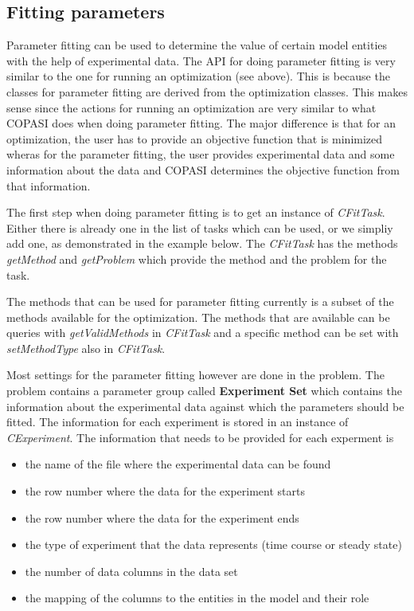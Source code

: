 \documentclass[a4,10pt]{article}
\begin{document}
\subsection{Fitting parameters}
\label{ParameterFitting}

Parameter fitting can be used to determine the value of certain model entities with the help of experimental data.
The API for doing parameter fitting is very similar to the one for running an optimization (see above). This is because the classes for parameter fitting are derived from the optimization classes.
This makes sense since the actions for running an optimization are very similar to what COPASI does when doing parameter fitting. The major difference is that for an optimization, the user has to provide an objective function that is minimized wheras for the parameter fitting, the user provides experimental data and some information about the data and COPASI determines the objective function from that information.

The first step when doing parameter fitting is to get an instance of \textit{CFitTask}. Either there is already one in the list of tasks which can be used, or we simpliy add one, as demonstrated in the example below.
The \textit{CFitTask} has the methods \textit{getMethod} and \textit{getProblem} which provide the method and the problem for the task.

The methods that can be used for parameter fitting currently is a subset of the methods available for the optimization. The methods that are available can be queries with \textit{getValidMethods} in \textit{CFitTask} and a specific method can be set with \textit{setMethodType} also in \textit{CFitTask}.

Most settings for the parameter fitting however are done in the problem. The problem contains a parameter group called \textbf{Experiment Set} which contains the information about the experimental data against which the parameters should be fitted.
The information for each experiment is stored in an instance of \textit{CExperiment}. The information that needs to be provided for each experment is 
\begin{itemize}
\item{the name of the file where the experimental data can be found}
\item{the row number where the data for the experiment starts}
\item{the row number where the data for the experiment ends}
\item{the type of experiment that the data represents (time course or steady state)}
\item{the number of data columns in the data set}
\item{the mapping of the columns to the entities in the model and their role}
\end{itemize}
\end{document}
